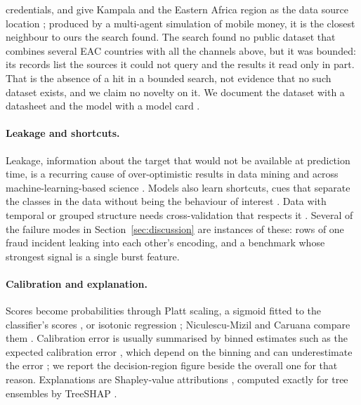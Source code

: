 credentials, and give Kampala and the Eastern Africa region as the data source location
\cite{azamuke2025momtsim}; produced by a multi-agent simulation of mobile money, it is the closest
neighbour to ours the search found. The search found no public dataset that combines several EAC countries with all
the channels above, but it was bounded:
its records list the sources it could not query and the results it read only in part. That is the
absence of a hit in a bounded search, not evidence that no such dataset exists, and we claim no
novelty on it. We document the dataset with a datasheet \cite{gebru2021datasheets} and the model
with a model card \cite{mitchell2019modelcards}.

\paragraph{Leakage and shortcuts.} Leakage, information about the target that would not be
available at prediction time, is a recurring cause of over-optimistic results in data mining
\cite{kaufman2012leakage} and across machine-learning-based science \cite{kapoor2023leakage}.
Models also learn shortcuts, cues that separate the classes in the data without being the
behaviour of interest \cite{geirhos2020shortcut}. Data with temporal or grouped structure needs
cross-validation that respects it \cite{roberts2017cv,bergmeir2012cv}. Several of the failure
modes in Section~\ref{sec:discussion} are instances of these: rows of one fraud incident leaking
into each other's encoding, and a benchmark whose strongest signal is a single burst feature.

\paragraph{Calibration and explanation.} Scores become probabilities through Platt scaling, a sigmoid fitted to
the classifier's scores \cite{platt2000probabilistic}, or isotonic regression
\cite{zadrozny2002calibration}; Niculescu-Mizil and Caruana compare them \cite{niculescumizil2005calibration}. Calibration error
is usually summarised by binned estimates such as the expected calibration error
\cite{naeini2015bbq,guo2017calibration}, which depend on the binning and can underestimate the
error \cite{kumar2019calibration}; we report the decision-region figure beside the overall one for
that reason. Explanations are Shapley-value attributions \cite{lundberg2017shap}, computed exactly
for tree ensembles by TreeSHAP \cite{lundberg2020trees}.


